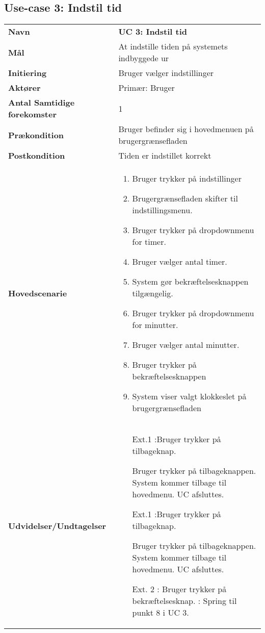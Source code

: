 \subsection{Use-case 3: Indstil tid}
\begin{tabular}{>{\bfseries}p{100pt} p{300pt}}
	Navn & \bfseries{UC 3: Indstil tid} \\
		Mål & At indstille tiden på systemets indbyggede ur\\
	Initiering & Bruger vælger indstillinger \\
	Aktører & Primær: Bruger \\
	Antal Samtidige forekomster & 1 \\
	Prækondition & Bruger befinder sig i hovedmenuen på brugergrænsefladen\\
	Postkondition & Tiden er indstillet korrekt \\
	Hovedscenarie & \begin{enumerate}
		\item Bruger trykker på indstillinger
		\item Brugergrænsefladen skifter til indstillingsmenu.
		\item Bruger trykker på dropdownmenu for timer.
		\subitem [Ext. 1: Bruger trykker på tilbageknap.]
		\item Bruger vælger antal timer.
		\subitem [Ext. 1: Bruger trykker på tilbageknap.]
		\item System gør bekræftelsesknappen tilgængelig.
		\item Bruger trykker på dropdownmenu for minutter.
		\subitem [Ext. 2: Bruger trykker på bekræftelsesknap]
		\subitem [Ext. 1: Bruger trykker på tilbageknap.]
		\item Bruger vælger antal minutter.
		\item Bruger trykker på bekræftelsesknappen 
		\subitem [Ext. 1: Bruger trykker på tilbageknap.]
		\item System viser valgt klokkeslet på brugergrænsefladen
		
	\end{enumerate} \\
	Udvidelser/Undtagelser & 
	\begin{enumerate}{}{}
	\item[Ext.1]:Bruger trykker på tilbageknap.
	
		\subitem[1.1] Bruger trykker på tilbageknappen.
		\subitem[1.2] System kommer tilbage til hovedmenu.	 
		\subitem[1.3]UC afsluttes. \newline 
	\end{enumerate}
	\begin{enumerate}{}{}
	\item[Ext.1]:Bruger trykker på tilbageknap.
	
		\subitem[1.1] Bruger trykker på tilbageknappen.
		\subitem[1.2] System kommer tilbage til hovedmenu.	 
		\subitem[1.3]UC afsluttes. \newline 
	\item [Ext. 2]: Bruger trykker på bekræftelsesknap.
		\subitem: Spring til punkt 8 i UC 3.
	\end{enumerate}
\end{tabular}